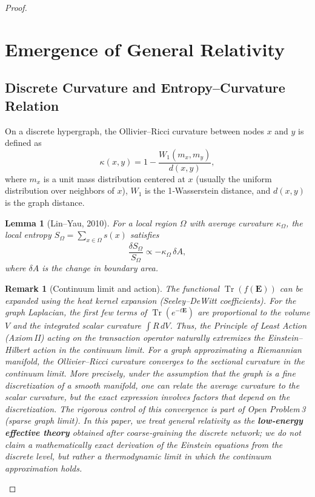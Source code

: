 \documentclass{article}
\newtheorem{lemma}[theorem]{Lemma}
\newtheorem{remark}[theorem]{Remark}
\begin{document}
\begin{proof}
\section{Emergence of General Relativity}
\subsection{Discrete Curvature and Entropy–Curvature Relation}
On a discrete hypergraph, the Ollivier–Ricci curvature between nodes $x$ and $y$ is defined as
\[
\kappa(x,y) = 1 - \frac{W_1(m_x, m_y)}{d(x,y)},
\]
where $m_x$ is a unit mass distribution centered at $x$ (usually the uniform distribution over neighbors of $x$), $W_1$ is the 1‑Wasserstein distance, and $d(x,y)$ is the graph distance.

\begin{lemma}[Lin–Yau, 2010]
For a local region $\Omega$ with average curvature $\kappa_\Omega$, the local entropy $S_\Omega = \sum_{x\in\Omega} s(x)$ satisfies
\[
\frac{\delta S_\Omega}{S_\Omega} \propto -\kappa_\Omega\,\delta A,
\]
where $\delta A$ is the change in boundary area.
\end{lemma}

\begin{remark}[Continuum limit and action]
The functional $\operatorname{Tr}(f(\mathbf{E}))$ can be expanded using the heat kernel expansion (Seeley–DeWitt coefficients). For the graph Laplacian, the first few terms of $\operatorname{Tr}(e^{-t\mathbf{E}})$ are proportional to the volume $V$ and the integrated scalar curvature $\int R \, dV$. Thus, the Principle of Least Action (Axiom II) acting on the transaction operator naturally extremizes the Einstein–Hilbert action in the continuum limit. For a graph approximating a Riemannian manifold, the Ollivier–Ricci curvature converges to the sectional curvature in the continuum limit. More precisely, under the assumption that the graph is a fine discretization of a smooth manifold, one can relate the average curvature to the scalar curvature, but the exact expression involves factors that depend on the discretization. The rigorous control of this convergence is part of Open Problem 3 (sparse graph limit). In this paper, we treat general relativity as the \textbf{low‑energy effective theory} obtained after coarse‑graining the discrete network; we do not claim a mathematically exact derivation of the Einstein equations from the discrete level, but rather a thermodynamic limit in which the continuum approximation holds.
\end{remark}


\end{proof}
\end{document}
